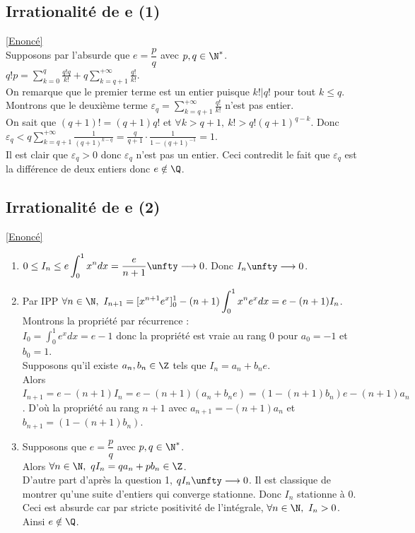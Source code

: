 \documentclass[8pt]{book}
\begin{document}
	\subsection{Irrationalité de e (1) }
	\label{Irrationalité de e (1) corrigé}
	\textcolor{blue}{\hyperref[Irrationalité de e (1)]{[Enoncé]}}\\
	Supposons par l'absurde que $e=\dfrac{p}{q}$ avec $p,q\in \N^*$.\\
	$q!p=\displaystyle\sum_{k=0}^q\frac{q!q}{k!}+q\sum_{k=q+1}^{+\infty}\frac{q!}{k!}$.\\
	On remarque que le premier terme est un entier puisque $k!|q!$ pour tout $k\leq q$.\\
	Montrons que le deuxième terme $\varepsilon_q=\displaystyle\sum_{k=q+1}^{+\infty}\frac{q!}{k!}$ n'est pas entier.\\
	On sait que $(q+1)!=(q+1)q!$ et $\forall k>q+1,\ k!>q!(q+1)^{q-k}$. Donc $\varepsilon_q<q\displaystyle\sum_{k=q+1}^{+\infty}\frac{1}{(q+1)^{k-q}}=\frac{q}{q+1}\cdot\frac{1}{1-(q+1)^{-1}}=1$.\\
	Il est clair que $\varepsilon_q>0$ donc $\varepsilon_q$ n'est pas un entier. Ceci contredit le fait que $\varepsilon_q$ est la différence de deux entiers donc $e\notin\Q$.
	
	\subsection{Irrationalité de e (2) }
	\label{Irrationalité de e (2) corrigé}
	\textcolor{blue}{\hyperref[Irrationalité de e (2)]{[Enoncé]}}\\
	\begin{enumerate}[leftmargin=*]
		\item $0\leq I_n\leq e\displaystyle\int_0^1x^ndx=\frac{e}{n+1}\unfty\longrightarrow 0$. Donc $I_n\unfty\longrightarrow 0$.
		\item Par IPP $\forall n\in \N,\ I_{n+1}=\displaystyle[x^{n+1}e^x]_0^1-(n+1)\int_0^1x^ne^xdx=e-(n+1)I_n$.\\
		Montrons la propriété par récurrence :\\
		$I_0=\displaystyle\int_0^1e^xdx=e-1$ donc la propriété est vraie au rang $0$ pour $a_0=-1$ et $b_0=1$.\\
		Supposons qu'il existe $a_n,b_n\in \Z$ tels que $I_n=a_n+b_ne$.\\
		Alors $I_{n+1}=e-(n+1)I_n=e-(n+1)(a_n+b_ne)=(1-(n+1)b_n)e-(n+1)a_n$. D'où la propriété au rang $n+1$ avec $a_{n+1}=-(n+1)a_n$ et $b_{n+1}=(1-(n+1)b_n)$.
		\item Supposons que $e=\dfrac{p}{q}$ avec $p,q\in \N^*$.\\
		Alors $\forall n\in \N,\ qI_n=qa_n+pb_n\in \Z$.\\
		D'autre part d'après la question 1, $qI_n\unfty\longrightarrow 0$. Il est classique de montrer qu'une suite d'entiers qui converge stationne. Donc $I_n$ stationne à $0$.\\
		Ceci est absurde car par stricte positivité de l'intégrale, $\forall n\in \N,\ I_n>0$.\\
		Ainsi $e\notin\Q$.
	\end{enumerate}
	
\end{document}
